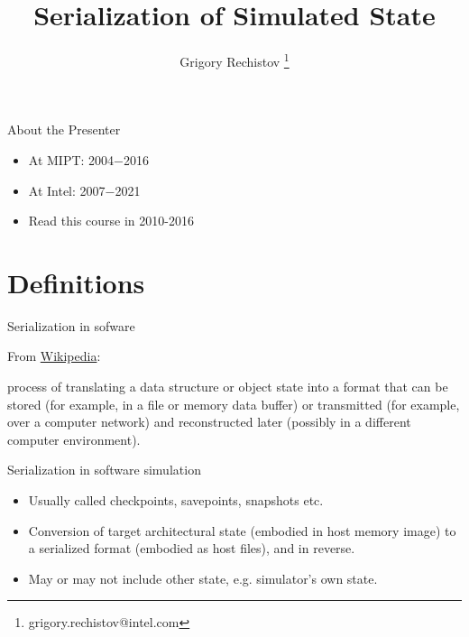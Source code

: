 

\author{Grigory Rechistov \thanks{grigory.rechistov@intel.com}}
\title{Serialization of Simulated State}



\startslides

\begin{frame}{About the Presenter}
\begin{itemize}
\item At MIPT: 2004−2016
\item At Intel: 2007−2021
\item Read this course in 2010-2016
\end{itemize}
\end{frame}



\section{Definitions}

\begin{frame}{Serialization in sofware}

From \href{https://en.wikipedia.org/wiki/Serialization}{Wikipedia}: \par process of translating a data structure or object state into a format that can be stored (for example, in a file or memory data buffer) or transmitted (for example, over a computer network) and reconstructed later (possibly in a different computer environment).

\end{frame}

\begin{frame}{Serialization in software simulation}

\begin{itemize}
    \item Usually called checkpoints, savepoints, snapshots etc.
    \item Conversion of target architectural state (embodied in host memory image) to a serialized format (embodied as host files), and in reverse.
    \item May or may not include other state, e.g. simulator's own state.
\end{itemize}

\end{frame}


